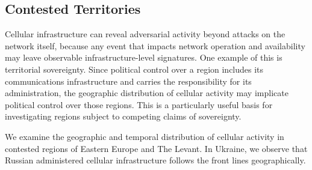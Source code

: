 \FloatBarrier
\clearpage

\subsection{Contested Territories}

Cellular infrastructure can reveal adversarial activity beyond attacks on the
network itself, because any event that impacts network operation and
availability may leave observable infrastructure-level signatures. One example
of this is territorial sovereignty. Since political control over a region
includes its communications infrastructure and carries the responsibility for
its administration, the geographic distribution of cellular activity may
implicate political control over those regions. This is a particularly useful
basis for investigating regions subject to competing claims of sovereignty.

We examine the geographic and temporal distribution of cellular activity in
contested regions of Eastern Europe and The Levant. In Ukraine, we observe that
Russian administered cellular infrastructure follows the front lines
geographically.

